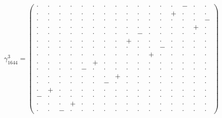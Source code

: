 \documentclass[
  10pt,
]{article}
\begin{document}
\[\gamma_{1644}^3=\left(\begin{smallmatrix} \cdot & \cdot & \cdot & \cdot & \cdot & \cdot & \cdot & \cdot & \cdot & \cdot & \cdot & \cdot & \cdot & - & \cdot & \cdot \\ \cdot & \cdot & \cdot & \cdot & \cdot & \cdot & \cdot & \cdot & \cdot & \cdot & \cdot & \cdot & + & \cdot & \cdot & \cdot \\ \cdot & \cdot & \cdot & \cdot & \cdot & \cdot & \cdot & \cdot & \cdot & \cdot & \cdot & \cdot & \cdot & \cdot & \cdot & - \\ \cdot & \cdot & \cdot & \cdot & \cdot & \cdot & \cdot & \cdot & \cdot & \cdot & \cdot & \cdot & \cdot & \cdot & + & \cdot \\ \cdot & \cdot & \cdot & \cdot & \cdot & \cdot & \cdot & \cdot & \cdot & - & \cdot & \cdot & \cdot & \cdot & \cdot & \cdot \\ \cdot & \cdot & \cdot & \cdot & \cdot & \cdot & \cdot & \cdot & + & \cdot & \cdot & \cdot & \cdot & \cdot & \cdot & \cdot \\ \cdot & \cdot & \cdot & \cdot & \cdot & \cdot & \cdot & \cdot & \cdot & \cdot & \cdot & - & \cdot & \cdot & \cdot & \cdot \\ \cdot & \cdot & \cdot & \cdot & \cdot & \cdot & \cdot & \cdot & \cdot & \cdot & + & \cdot & \cdot & \cdot & \cdot & \cdot \\ \cdot & \cdot & \cdot & \cdot & \cdot & + & \cdot & \cdot & \cdot & \cdot & \cdot & \cdot & \cdot & \cdot & \cdot & \cdot \\ \cdot & \cdot & \cdot & \cdot & - & \cdot & \cdot & \cdot & \cdot & \cdot & \cdot & \cdot & \cdot & \cdot & \cdot & \cdot \\ \cdot & \cdot & \cdot & \cdot & \cdot & \cdot & \cdot & + & \cdot & \cdot & \cdot & \cdot & \cdot & \cdot & \cdot & \cdot \\ \cdot & \cdot & \cdot & \cdot & \cdot & \cdot & - & \cdot & \cdot & \cdot & \cdot & \cdot & \cdot & \cdot & \cdot & \cdot \\ \cdot & + & \cdot & \cdot & \cdot & \cdot & \cdot & \cdot & \cdot & \cdot & \cdot & \cdot & \cdot & \cdot & \cdot & \cdot \\ - & \cdot & \cdot & \cdot & \cdot & \cdot & \cdot & \cdot & \cdot & \cdot & \cdot & \cdot & \cdot & \cdot & \cdot & \cdot \\ \cdot & \cdot & \cdot & + & \cdot & \cdot & \cdot & \cdot & \cdot & \cdot & \cdot & \cdot & \cdot & \cdot & \cdot & \cdot \\ \cdot & \cdot & - & \cdot & \cdot & \cdot & \cdot & \cdot & \cdot & \cdot & \cdot & \cdot & \cdot & \cdot & \cdot & \cdot \end{smallmatrix}\right)\]
\end{document}

